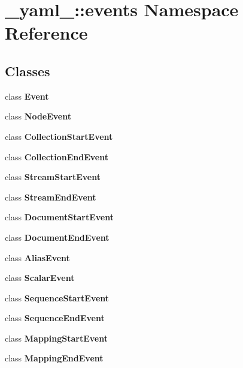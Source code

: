 \section{\_\-yaml\_\-::events Namespace Reference}
\label{namespace__yaml___1_1events}


\subsection*{Classes}
\begin{CompactItemize}
\item 
class {\bf Event}
\item 
class {\bf NodeEvent}
\item 
class {\bf CollectionStartEvent}
\item 
class {\bf CollectionEndEvent}
\item 
class {\bf StreamStartEvent}
\item 
class {\bf StreamEndEvent}
\item 
class {\bf DocumentStartEvent}
\item 
class {\bf DocumentEndEvent}
\item 
class {\bf AliasEvent}
\item 
class {\bf ScalarEvent}
\item 
class {\bf SequenceStartEvent}
\item 
class {\bf SequenceEndEvent}
\item 
class {\bf MappingStartEvent}
\item 
class {\bf MappingEndEvent}
\end{CompactItemize}
